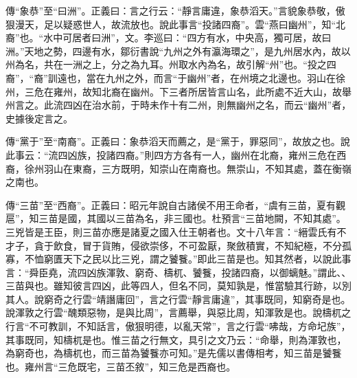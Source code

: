 {\noindent\zhuan{}\fzbyks 傳“象恭”至“曰洲”。正義曰：言之行云：“靜言庸違，象恭滔天。”言貌象恭敬，傲狠漫天，足以疑惑世人，故流放也。說此事言“投諸四裔”。雲“燕曰幽州”，知“北裔”也。“水中可居者曰洲”，文。李巡曰：“四方有水，中央高，獨可居，故曰洲。”天地之勢，四邊有水，鄒衍書說“九州之外有瀛海環之”，是九州居水內，故以州為名，共在一洲之上，分之為九耳。州取水內為名，故引解“州”也。“投之四裔”，“裔”訓遠也，當在九州之外，而言“于幽州”者，在州境之北邊也。羽山在徐州，三危在雍州，故知北裔在幽州。下三者所居皆言山名，此所處不近大山，故舉州言之。此流四凶在治水前，于時未作十有二州，則無幽州之名，而云“幽州”者，史據後定言之。 \par}

{\noindent\zhuan{}\fzbyks 傳“黨于”至“南裔”。正義曰：象恭滔天而薦之，是“黨于，罪惡同”，故放之也。說此事云：“流四凶族，投諸四裔。”則四方方各有一人，幽州在北裔，雍州三危在西裔，徐州羽山在東裔，三方既明，知崇山在南裔也。無崇山，不知其處，蓋在衡嶺之南也。 \par}

{\noindent\zhuan{}\fzbyks 傳“三苗”至“西裔”。正義曰：昭元年說自古諸侯不用王命者，“虞有三苗，夏有觀扈”，知三苗是國，其國以三苗為名，非三國也。杜預言“三苗地闕，不知其處”。三兇皆是王臣，則三苗亦應是諸夏之國入仕王朝者也。文十八年言：“縉雲氏有不才子，貪于飲食，冒于貨賄，侵欲崇侈，不可盈厭，聚斂積實，不知紀極，不分孤寡，不恤窮匱天下之民以比三兇，謂之饕餮。”即此三苗是也。知其然者，以說此事言：“舜臣堯，流四凶族渾敦、窮奇、檮杌、饕餮，投諸四裔，以御螭魅。”謂此、、三苗與也。雖知彼言四凶，此等四人，但名不同，莫知孰是，惟當驗其行跡，以別其人。說窮奇之行雲“靖譖庸回”，言之行雲“靜言庸違”，其事既同，知窮奇是也。說渾敦之行雲“醜類惡物，是與比周”，言薦舉，與惡比周，知渾敦是也。說檮杌之行言“不可教訓，不知話言，傲狠明德，以亂天常”，言之行雲“咈哉，方命圮族”，其事既同，知檮杌是也。惟三苗之行無文，具引之文乃云：“命舉，則為渾敦也，為窮奇也，為檮杌也，而三苗為饕餮亦可知。”是先儒以書傳相考，知三苗是饕餮也。雍州言“三危既宅，三苗丕敘”，知三危是西裔也。 \par}

